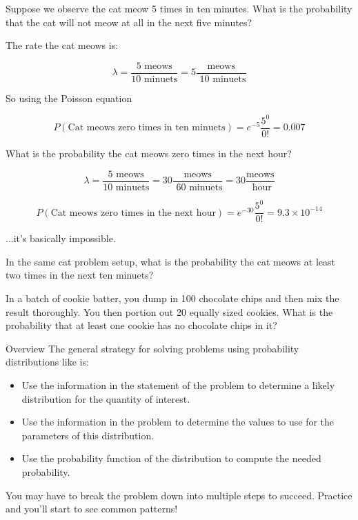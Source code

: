 %
\begin{frame}
Suppose we observe the cat meow 5 times in ten minutes.  What is the probability
that the cat will not meow at all in the next five minutes?
\end{frame}
%

%
\begin{frame}
The rate the cat meows is:

$$ \lambda = \frac{5 \text{ meows}}{10 \text{ minuets}} = 5 \frac{ \text{
meows}}{\text{ 10 minuets}} $$

So using the Poisson equation

$$ P(\text{Cat meows zero times in ten minuets}) = e^{-5} \frac{5^0}{0!} = 0.007
$$
\end{frame}
%

%
\begin{frame}
What is the probability the cat meows zero times in the next hour?

$$ 
\lambda = \frac{5 \text{ meows}}{10 \text{ minuets}} = 30 \frac{ \text{
meows}}{\text{ 60 minuets}} = 30 \frac{ \text{
meows}}{\text{ hour}}
$$

$$ P(\text{Cat meows zero times in the next hour}) = e^{-30} \frac{5^0}{0!} =
9.3 \times 10^{-14}
$$

...it's basically impossible.
\end{frame}
%

%
\begin{frame}

In the same cat problem setup, what is the probability the cat meows at
least two times in the next ten minuets?

\hfill

In a batch of cookie batter, you dump in 100 chocolate chips and then mix the
result thoroughly.  You then portion out 20 equally sized cookies.  What is the
probability that at least one cookie has no chocolate chips in it?

\end{frame}
%

%
\begin{frame}{Overview}
The general strategy for solving problems using probability distributions like is:

\begin{itemize}
\item Use the information in the statement of the problem to determine a likely
distribution for the quantity of interest.
\item Use the information in the problem to determine the values to use for the
parameters of this distribution.
\item Use the probability function of the distribution to compute the needed
probability.
\end{itemize}

You may have to break the problem down into multiple steps to succeed.  Practice
and you'll start to see common patterns!

\end{frame}
%

